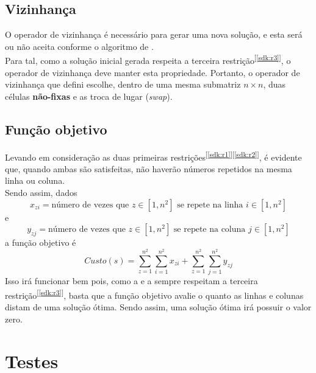 \documentclass[10pt,a4paper,titlepage]{article}
\begin{document}
	\subsection{Vizinhança} \label{aplic:viz}
	O operador de vizinhança é necessário para gerar uma nova solução, e esta será ou não aceita conforme o algoritmo de . \\
	Para tal, como a solução inicial gerada respeita a terceira restrição\textsuperscript{[\ref{sdk:r3}]}, o operador de vizinhança deve manter esta propriedade. Portanto, o operador de vizinhança que defini escolhe, dentro de uma mesma submatriz $n \times n$, duas células \textbf{não-fixas} e as troca de lugar (\emph{swap}).
	
	\subsection{Função objetivo}
	Levando em consideração as duas primeiras restrições\textsuperscript{[\ref{sdk:r1}][\ref{sdk:r2}]}, é evidente que, quando ambas são satisfeitas, não haverão números repetidos na mesma linha ou coluna.\\
	Sendo assim, dados
	\begin{equation*}
		x_{zi} = \text{número de vezes que $z \in [1,n^2]$ se repete na linha $i \in [1,n^2]$}
	\end{equation*}
	e
	\begin{equation*}
		y_{zj} = \text{número de vezes que $z \in [1,n^2]$ se repete na coluna $j \in [1,n^2]$}
	\end{equation*}
	a função objetivo é
	\begin{equation*}
	Custo(s) = \sum\limits_{z=1}^{n^2} \sum\limits_{i=1}^{n^2} x_{zi} + \sum\limits_{z=1}^{n^2} \sum\limits_{j=1}^{n^2} y_{zj}
	\end{equation*}
	Isso irá funcionar bem pois, como a  e a  sempre respeitam a terceira restrição\textsuperscript{[\ref{sdk:r3}]}, basta que a função objetivo avalie o quanto as linhas e colunas distam de uma solução ótima. Sendo assim, uma solução ótima irá possuir o valor zero.
	
\section{Testes}
\end{document}
